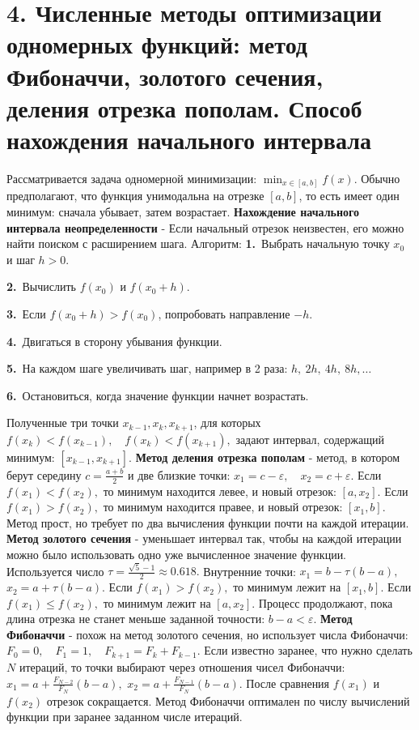 \documentclass[12pt,a4paper]{article}
\begin{document}
\section{4. Численные методы оптимизации одномерных функций: метод Фибоначчи, золотого сечения, деления отрезка пополам. Способ нахождения начального интервала}
Рассматривается задача одномерной минимизации: $\min_{x \in [a,b]} f(x).$
Обычно предполагают, что функция унимодальна на отрезке $[a,b]$, то есть имеет один минимум: сначала убывает, затем возрастает.
\textbf{Нахождение начального интервала неопределенности} - Если начальный отрезок неизвестен, его можно найти поиском с расширением шага.
Алгоритм:
\noindent\textbf{1.}\ Выбрать начальную точку $x_0$ и шаг $h>0$.\par
\noindent\textbf{2.}\ Вычислить $f(x_0)$ и $f(x_0+h)$.\par
\noindent\textbf{3.}\ Если $f(x_0+h)>f(x_0)$, попробовать направление $-h$.\par
\noindent\textbf{4.}\ Двигаться в сторону убывания функции.\par
\noindent\textbf{5.}\ На каждом шаге увеличивать шаг, например в 2 раза: $h,\ 2h,\ 4h,\ 8h,\ldots$\par
\noindent\textbf{6.}\ Остановиться, когда значение функции начнет возрастать.\par
Полученные три точки $x_{k-1}, x_k, x_{k+1}$, для которых $f(x_k) < f(x_{k-1}),\quad f(x_k)<f(x_{k+1}),$
задают интервал, содержащий минимум: $[x_{k-1},x_{k+1}].$
\textbf{Метод деления отрезка пополам} - метод, в котором берут середину $c=\frac{a+b}{2}$
и две близкие точки: $x_1=c-\varepsilon,\quad x_2=c+\varepsilon.$
Если $f(x_1)<f(x_2),$
то минимум находится левее, и новый отрезок: $[a,x_2].$
Если $f(x_1)>f(x_2),$
то минимум находится правее, и новый отрезок: $[x_1,b].$
Метод прост, но требует по два вычисления функции почти на каждой итерации.
\textbf{Метод золотого сечения} - уменьшает интервал так, чтобы на каждой итерации можно было использовать одно уже вычисленное значение функции.
Используется число $\tau = \frac{\sqrt{5}-1}{2} \approx 0.618.$
Внутренние точки: $x_1=b-\tau(b-a),$ $x_2=a+\tau(b-a).$
Если $f(x_1)>f(x_2),$
то минимум лежит на $[x_1,b]$.
Если $f(x_1)\le f(x_2),$
то минимум лежит на $[a,x_2]$.
Процесс продолжают, пока длина отрезка не станет меньше заданной точности: $b-a < \varepsilon.$
\textbf{Метод Фибоначчи} - похож на метод золотого сечения, но использует числа Фибоначчи: $F_0=0,\quad F_1=1,\quad F_{k+1}=F_k+F_{k-1}.$
Если известно заранее, что нужно сделать $N$ итераций, то точки выбирают через отношения чисел Фибоначчи: $x_1 = a + \frac{F_{N-2}}{F_N}(b-a),$ $x_2 = a + \frac{F_{N-1}}{F_N}(b-a).$
После сравнения $f(x_1)$ и $f(x_2)$ отрезок сокращается. Метод Фибоначчи оптимален по числу вычислений функции при заранее заданном числе итераций.
\end{document}
